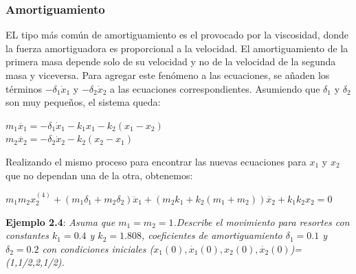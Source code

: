 \documentclass{article}
\begin{document}
\subsubsection{Amortiguamiento}
EL tipo más común de amortiguamiento es el provocado por la viscosidad, donde la fuerza amortiguadora es proporcional a la velocidad. El amortiguamiento de la primera masa depende solo de su velocidad y no de la velocidad de la segunda masa y viceversa. Para agregar este fenómeno a las ecuaciones, se añaden los términos $-\delta_{1} \dot{x}_{1}$ y $-\delta_{2} \dot{x}_{2}$ a las ecuaciones correspondientes. Asumiendo que $\delta_{1}$ y $\delta_{2}$ son muy pequeños, el sistema queda:
\begin{center}
$m_{1}\ddot{x_{1}}=-\delta_{1} \dot{x}_{1}-k_{1}x_{1}-k_{2}(x_{1}-x_{2})$ \\
$m_{2}\ddot{x_{2}}=-\delta_{2} \dot{x}_{2}-k_{2}(x_{2}-x_{1})$
\end{center}
Realizando el mismo proceso para encontrar las nuevas ecuaciones para $x_{1}$ y $x_{2}$ que no dependan una de la otra, obtenemos:
\begin{center}
$m_{1}m_{2}x_{2}^{(4)}+(m_{1}\delta_{1}+m_{2}\delta_{2})\dddot{x}_{1}+(m_{2}k_{1}+k_{2}(m_{1}+m_{2}))\ddot{x_{2}}+k_{1}k_{2}x_{2}=0$
\end{center}

\textbf{Ejemplo 2.4}:\textsl{ Asuma que $m_{1}=m_{2}=1$.Describe el movimiento para resortes con constantes $k_{1}=0.4$ y $k_{2}=1.808$, coeficientes de amortiguamiento $\delta_{1}=0.1$ y $\delta_{2}=0.2$ con condiciones iniciales ($x_{1}(0),\dot{x_{1}}(0), x_{2}(0),\dot{x_{2}}(0)$)=(1,1/2,2,1/2).}
\end{document}
